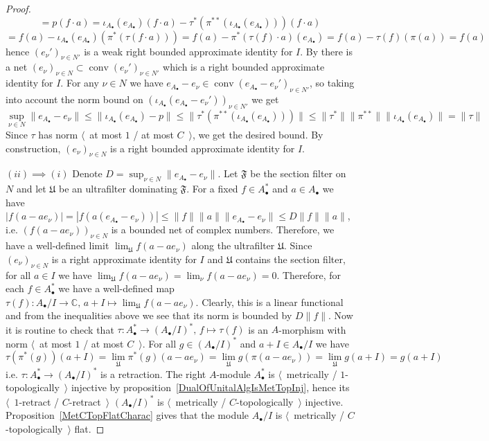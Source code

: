 \begin{proof}
\[=p(f\cdot a)
=\iota_{A_\bullet }(e_{A_\bullet })(f\cdot a)
-\tau^*(\pi^{**}(\iota_{A_\bullet }(e_{A_\bullet })))(f\cdot a)
\]
\[
=f(a)-\iota_{A_\bullet }(e_{A_\bullet })(\pi^*(\tau(f\cdot a)))
=f(a)-\pi^*(\tau(f)\cdot a)(e_{A_\bullet })
=f(a)-\tau(f)(\pi(a))
=f(a)
\]
hence ${(e_\nu')}_{\nu\in N'}$ is a weak right bounded approximate identity for
$I$. By \cite[proposition 33.2]{AppIdAndFactorInBanAlg} there is a net
${(e_\nu)}_{\nu\in N}\subset\operatorname{conv}{(e_\nu')}_{\nu\in N'}$ which is
a right bounded approximate identity for $I$. For any $\nu\in N$ we have
$e_{A_\bullet }-e_\nu\in\operatorname{conv}{(e_{A_\bullet }-e_\nu')}_{\nu\in N'}$,
so taking into account the norm bound 
on ${(\iota_{A_\bullet }(e_{A_\bullet}-e_\nu'))}_{\nu\in N'}$ we get 
\[
\sup_{\nu\in N}\lVert e_{A_\bullet }-e_\nu\rVert
\leq\lVert \iota_{A_\bullet }(e_{A_\bullet })-p\rVert
\leq\lVert\tau^*(\pi^{**}(\iota_{A_\bullet }(e_{A_\bullet })))\rVert
\leq\lVert\tau^*\rVert\lVert\pi^{**}\rVert\lVert\iota_{A_\bullet }(e_{A_\bullet })\rVert
=\lVert\tau\rVert
\]
Since $\tau$ has norm $\langle$~at most $1$ / at most $C$~$\rangle$, we get the
desired bound. By construction, ${(e_\nu)}_{\nu\in N}$ is a right bounded
approximate identity for $I$.

$(ii)\implies (i)$ Denote $D=\sup_{\nu\in N}\lVert e_{A_\bullet }-e_\nu\rVert$.
Let $\mathfrak{F}$ be the section filter on $N$ and let $\mathfrak{U}$ be an
ultrafilter dominating $\mathfrak{F}$. For a fixed $f\in A_\bullet ^*$ 
and $a\in A_\bullet $ we have 
$|f(a-a e_\nu)|=|f(a(e_{A_\bullet }-e_\nu))|
\leq\lVert f\rVert\lVert a\rVert\lVert e_{A_\bullet }-e_\nu\rVert
\leq D\lVert f\rVert\lVert a\rVert$,
i.e. ${(f(a-ae_\nu))}_{\nu\in N}$ is a bounded net of complex numbers. Therefore,
we have a well-defined limit $\lim_{\mathfrak{U}}f(a-ae_\nu)$ along the ultrafilter
$\mathfrak{U}$. Since ${(e_\nu)}_{\nu\in N}$ is a right approximate identity for
$I$ and $\mathfrak{U}$ contains the section filter, for all $a\in I$ we have
$\lim_{\mathfrak{U}}f(a-ae_\nu)=\lim_{\nu}f(a-ae_\nu)=0$. Therefore, for each
$f\in A_\bullet ^*$ we have a well-defined map $\tau(f):A_\bullet /I\to
\mathbb{C},\, a+I\mapsto \lim_{\mathfrak{U}} f(a-ae_\nu)$. Clearly, this is a
linear functional and from the inequalities above we see that its norm is bounded 
by $D\lVert f\rVert$. Now it is routine to check 
that $\tau:A_\bullet ^*\to {(A_\bullet /I)}^*,\, f\mapsto \tau(f)$ is 
an $A$-morphism with norm $\langle$~at most $1$ / at most $C$~$\rangle$. 
For all $g\in{(A_\bullet /I)}^*$ and $a+I\in A_\bullet /I$ we have
\[
\tau(\pi^*(g))(a+I)
=\lim_{\mathfrak{U}}\pi^*(g)(a-ae_\nu)
=\lim_{\mathfrak{U}} g(\pi(a-ae_\nu))
=\lim_{\mathfrak{U}} g(a+I)
=g(a+I)
\]
i.e. $\tau:A_\bullet ^*\to {(A_\bullet /I)}^*$ is a retraction. The right
$A$-module $A_\bullet ^*$ is $\langle$~metrically / $1$-topologically~$\rangle$
injective by proposition~\ref{DualOfUnitalAlgIsMetTopInj}, hence its
$\langle$~$1$-retract / $C$-retract~$\rangle$ ${(A_\bullet /I)}^*$ is
$\langle$~metrically / $C$-topologically~$\rangle$ injective. 
Proposition~\ref{MetCTopFlatCharac} gives that the
module $A_\bullet /I$ is $\langle$~metrically / $C$-topologically~$\rangle$ flat.
\end{proof}

